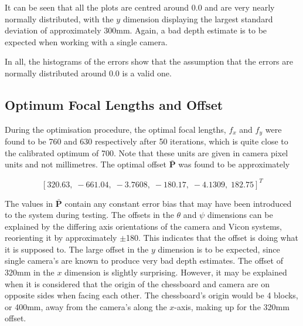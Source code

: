 

It can be seen that all the plots are centred around 0.0 and are very nearly normally distributed, with the $y$ dimension displaying the largest standard deviation of approximately 300mm. Again, a bad depth estimate is to be expected when working with a single camera.

In all, the histograms of the errors show that the assumption that the errors are normally distributed around 0.0 is a valid one. 

\subsection{Optimum Focal Lengths and Offset}

During the optimisation procedure, the optimal focal lengths, $f_x$ and $f_y$ were found to be 760 and 630 respectively after 50 iterations, which is quite close to the calibrated optimum of 700. Note that these units are given in camera pixel units and not millimetres. The optimal offset $\bar{\bm{P}}$ was found to be approximately

\[
  {[320.63,\;-661.04,\;-3.7608,\;-180.17,\;-4.1309,\;182.75]}^T
\]

The values in $\bar{\bm{P}}$ contain any constant error bias that may have been introduced to the system during testing. The offsets in the $\theta$ and $\psi$ dimensions can be explained by the differing axis orientations of the camera and Vicon systems, reorienting it by approximately $\pm$180\degree. This indicates that the offset is doing what it is supposed to. The large offset in the $y$ dimension is to be expected, since single camera's are known to produce very bad depth estimates. The offset of 320mm in the $x$ dimension is slightly surprising. However, it may be explained when it is considered that the origin of the chessboard and camera are on opposite sides when facing each other. The chessboard's origin would be 4 blocks, or 400mm, away from the camera's along the $x$-axis, making up for the 320mm offset.

